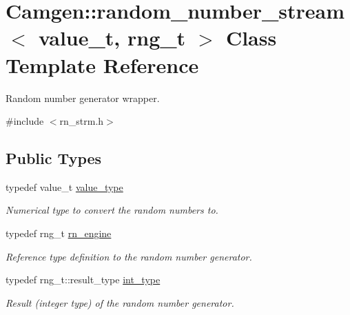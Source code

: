 \hypertarget{a00471}{}\section{Camgen\+:\+:random\+\_\+number\+\_\+stream$<$ value\+\_\+t, rng\+\_\+t $>$ Class Template Reference}
\label{a00471}


Random number generator wrapper.  




{\ttfamily \#include $<$rn\+\_\+strm.\+h$>$}

\subsection*{Public Types}
\begin{DoxyCompactItemize}
\item 
\hypertarget{a00471_a9294408b4bf4d469d2cb1682e10225a8}{}typedef value\+\_\+t \hyperlink{a00471_a9294408b4bf4d469d2cb1682e10225a8}{value\+\_\+type}\label{a00471_a9294408b4bf4d469d2cb1682e10225a8}

\begin{DoxyCompactList}\small\item\em Numerical type to convert the random numbers to. \end{DoxyCompactList}\item 
\hypertarget{a00471_a92bc880a1666c8fcd7caba5fed55009c}{}typedef rng\+\_\+t \hyperlink{a00471_a92bc880a1666c8fcd7caba5fed55009c}{rn\+\_\+engine}\label{a00471_a92bc880a1666c8fcd7caba5fed55009c}

\begin{DoxyCompactList}\small\item\em Reference type definition to the random number generator. \end{DoxyCompactList}\item 
\hypertarget{a00471_aaea501ae2db60d08b10b98b3cf499f37}{}typedef rng\+\_\+t\+::result\+\_\+type \hyperlink{a00471_aaea501ae2db60d08b10b98b3cf499f37}{int\+\_\+type}\label{a00471_aaea501ae2db60d08b10b98b3cf499f37}

\begin{DoxyCompactList}\small\item\em Result (integer type) of the random number generator. \end{DoxyCompactList}\end{DoxyCompactItemize}
